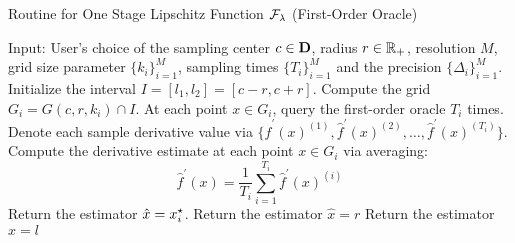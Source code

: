 \begin{algorithm}[H]
\caption{Routine for One Stage Lipschitz Function $\mathcal{F}_\lambda$ 
	(First-Order Oracle)}  %
\begin{algorithmic}[1]  %
\Statex Input: User's choice of the sampling center $c \in \mathbf{D}$, radius 
	$r\in \mathbb{R}_+$, resolution $M$, grid size parameter $\{k_i\}_{i=1}^M$, 
	sampling times $\{T_i\}_{i=1}^M$ and the precision $\{\Delta_i\}_{i=1}^M$. 
\State Initialize the interval $I = [l_1, l_2] = [c-r, c+r]$.
	\State Compute the grid $G_i = G(c, r, k_i) \cap I$.
	\State At each point $x\in G_i$, query the first-order oracle $T_i$ times. 
		Denote each sample derivative value via $\{\hat{f}^\prime(x)^{(1)}, 
		\hat{f}^\prime(x)^{(2)}, \ldots, \hat{f}^\prime(x)^{(T_i)}\}$. 
	\State Compute the derivative estimate at each point $x\in G_i$ via 
		averaging: 
		\begin{equation*}
			\hat{f}^\prime(x) = \frac{1}{T_i} \sum_{i=1}^{T_i} {\hat{f}^\prime(x)^{(i)}}
		\end{equation*}
			\State Return the estimator $\hat{x} = x_i^\star$.
			\State Return the estimator $\hat{x} = r$
			\State Return the estimator $\hat{x} = l$
		\ENDIF
\ENDFOR 

\end{algorithmic}
\end{algorithm}
